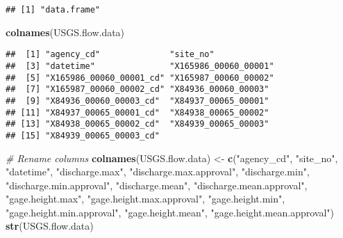 \documentclass[]{article}
\newenvironment{Shaded}{\begin{snugshade}}{\end{snugshade}}
\newcommand{\KeywordTok}[1]{\textcolor[rgb]{0.13,0.29,0.53}{\textbf{#1}}}
\newcommand{\StringTok}[1]{\textcolor[rgb]{0.31,0.60,0.02}{#1}}
\newcommand{\CommentTok}[1]{\textcolor[rgb]{0.56,0.35,0.01}{\textit{#1}}}
\newcommand{\NormalTok}[1]{#1}
\begin{document}
\begin{verbatim}
## [1] "data.frame"
\end{verbatim}

\begin{Shaded}
\begin{Highlighting}[]
\KeywordTok{colnames}\NormalTok{(USGS.flow.data)}
\end{Highlighting}
\end{Shaded}

\begin{verbatim}
##  [1] "agency_cd"              "site_no"               
##  [3] "datetime"               "X165986_00060_00001"   
##  [5] "X165986_00060_00001_cd" "X165987_00060_00002"   
##  [7] "X165987_00060_00002_cd" "X84936_00060_00003"    
##  [9] "X84936_00060_00003_cd"  "X84937_00065_00001"    
## [11] "X84937_00065_00001_cd"  "X84938_00065_00002"    
## [13] "X84938_00065_00002_cd"  "X84939_00065_00003"    
## [15] "X84939_00065_00003_cd"
\end{verbatim}

\begin{Shaded}
\begin{Highlighting}[]
\CommentTok{# Rename columns}
\KeywordTok{colnames}\NormalTok{(USGS.flow.data) <-}\StringTok{ }\KeywordTok{c}\NormalTok{(}\StringTok{"agency_cd"}\NormalTok{, }\StringTok{"site_no"}\NormalTok{, }\StringTok{"datetime"}\NormalTok{, }
                              \StringTok{"discharge.max"}\NormalTok{, }\StringTok{"discharge.max.approval"}\NormalTok{, }
                              \StringTok{"discharge.min"}\NormalTok{, }\StringTok{"discharge.min.approval"}\NormalTok{, }
                              \StringTok{"discharge.mean"}\NormalTok{, }\StringTok{"discharge.mean.approval"}\NormalTok{, }
                              \StringTok{"gage.height.max"}\NormalTok{, }\StringTok{"gage.height.max.approval"}\NormalTok{, }
                              \StringTok{"gage.height.min"}\NormalTok{, }\StringTok{"gage.height.min.approval"}\NormalTok{, }
                              \StringTok{"gage.height.mean"}\NormalTok{, }\StringTok{"gage.height.mean.approval"}\NormalTok{)}
\KeywordTok{str}\NormalTok{(USGS.flow.data)}
\end{Highlighting}
\end{Shaded}
\end{document}

